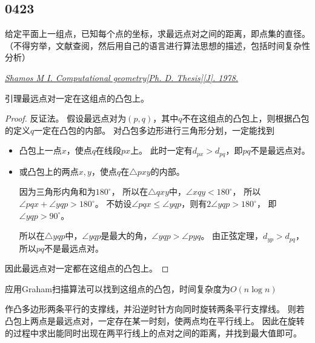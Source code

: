 \documentclass[answers]{exam}
\begin{document}
\begin{questions}
    \newpage %
    \section{0423}\label{sec:0423}

    \question 给定平面上一组点，已知每个点的坐标，求最远点对之间的距离，即点集的直径。
    （不得穷举，文献查阅，然后用自己的语言进行算法思想的描述，包括时间复杂性分析）

    \begin{solution}
        \textit{
            \href{http://euro.ecom.cmu.edu/people/faculty/mshamos/1978ShamosThesis.pdf}
            {Shamos M I. Computational geometry[Ph. D. Thesis][J]. 1978.}
        }

        \textsf{引理\quad}最远点对一定在这组点的凸包上。

        \begin{proof}
            反证法。
            假设最远点对为$(p,q)$，其中$q$不在这组点的凸包上，则根据凸包的定义$q$一定在凸包的内部。
            对凸包多边形进行三角形分划，一定能找到\begin{itemize}
                \item {
                      凸包上一点$x$，使点$q$在线段$px$上。
                      此时一定有$d_{px} > d_{pq}$，即$pq$不是最远点对。
                      }
                \item {
                      或凸包上的两点$x,y$，使点$q$在$\triangle pxy$的内部。

                      因为三角形内角和为$180^\circ$，
                      所以在$\triangle qxy$中，$\angle xqy < 180^\circ$，
                      所以$\angle pqx + \angle yqp > 180^\circ$。
                      不妨设$\angle pqx \le \angle yqp$，则有$2 \angle yqp > 180^\circ$，
                      即$\angle yqp > 90^\circ$。

                      所以在$\triangle yqp$中，$\angle yqp$是最大的角，$\angle yqp > \angle pyq$。
                      由正弦定理，$d_{yp} > d_{pq}$，所以$pq$不是最远点对。
                      }
            \end{itemize}
            因此最远点对一定都在这组点的凸包上。
        \end{proof}
        应用Graham扫描算法可以找到这组点的凸包，时间复杂度为$O(n \log n)$

        作凸多边形两条平行的支撑线，并沿逆时针方向同时旋转两条平行支撑线。
        则若凸包上两点是最远点对，一定存在某一时刻，使两点均在平行线上。
        因此在旋转的过程中求出能同时出现在两平行线上的点对之间的距离，并找到最大值即可。


\end{solution}
\end{questions}
\end{document}
